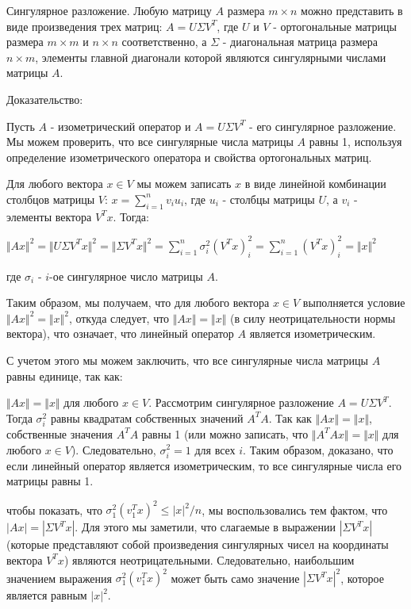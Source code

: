 \documentclass[a4paper]{article}
\begin{document}
Сингулярное разложение. Любую матрицу $A$ размера $m \times n$ можно представить в виде произведения трех матриц: $A = U \Sigma V^T$, где $U$ и $V$ - ортогональные матрицы размера $m \times m$ и $n \times n$ соответственно, а $\Sigma$ - диагональная матрица размера $n \times m$, элементы главной диагонали которой являются сингулярными числами матрицы $A$.

Доказательство:

Пусть $A$ - изометрический оператор и $A = U \Sigma V^T$ - его сингулярное разложение. Мы можем проверить, что все сингулярные числа матрицы $A$ равны 1, используя определение изометрического оператора и свойства ортогональных матриц.

Для любого вектора $x \in V$ мы можем записать $x$ в виде линейной комбинации столбцов матрицы $V$: $x = \sum_{i=1}^n v_i u_i$, где $u_i$ - столбцы матрицы $U$, а $v_i$ - элементы вектора $V^T x$. Тогда:

$\Vert A x \Vert^2 = \Vert U \Sigma V^T x \Vert^2 = \Vert \Sigma V^T x \Vert^2 = \sum_{i=1}^n \sigma_i^2 (V^T x)_i^2 = \sum_{i=1}^n (V^T x)_i^2 = \Vert x \Vert^2$

 
где $\sigma_i$ - $i$-ое сингулярное число матрицы $A$.

Таким образом, мы получаем, что для любого вектора $x \in V$ выполняется условие $\Vert A x \Vert^2 = \Vert x \Vert^2$, откуда следует, что $\Vert A x \Vert = \Vert x \Vert$ (в силу неотрицательности нормы вектора), что означает, что линейный оператор $A$ является изометрическим.

С учетом этого мы можем заключить, что все сингулярные числа матрицы $A$ равны единице, так как:

$\Vert A x \Vert = \Vert x \Vert$ для любого $x \in V$.
Рассмотрим сингулярное разложение $A=U\Sigma V^T$. Тогда $\sigma_i^2$ равны квадратам собственных значений $A^TA$. Так как $\Vert A x \Vert = \Vert x \Vert$, собственные значения $A^TA$ равны 1 (или можно записать, что $\Vert A^TAx \Vert = \Vert x \Vert$ для любого $x \in V$). Следовательно, $\sigma_i^2 = 1$ для всех $i$.
Таким образом, доказано, что если линейный оператор является изометрическим, то все сингулярные числа его матрицы равны 1.




чтобы показать, что $\sigma_1^2(v_1^Tx)^2 \leq |x|^2/n$, мы воспользовались тем фактом, что $|Ax| = |\Sigma V^Tx|$. Для этого мы заметили, что слагаемые в выражении $|\Sigma V^Tx|$ (которые представляют собой произведения сингулярных чисел на координаты вектора $V^Tx$) являются неотрицательными. Следовательно, наибольшим значением выражения $\sigma_1^2(v_1^Tx)^2$ может быть само значение $|\Sigma V^Tx|^2$, которое является равным $|x|^2$.
\end{document}
